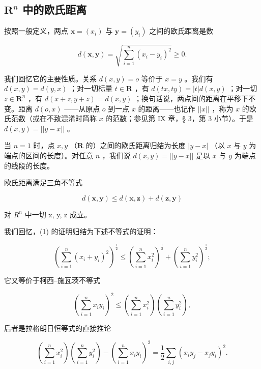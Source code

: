 \subsection{\texorpdfstring{\(\mathbf{R}^n\) 中的欧氏距离}{R 的 n 次幂中的欧氏距离}}

按照一般定义，两点 \(\boldsymbol{x} = (x_{i})\) 与 \(\boldsymbol{y} = (y_{i})\) 之间的欧氏距离是数

\[
d (\boldsymbol {x}, \boldsymbol {y}) = \sqrt {\sum_ {i = 1} ^ {n} (x _ {i} - y _ {i}) ^ {2}} \geqslant 0.
\]

我们回忆它的主要性质。关系 \(d(x, y) = o\) 等价于 \(x = y\) 。我们有 \(d(x, y) = d(y, x)\) ；对一切标量 \(t \in \mathbf{R}\) ，有 \(d(tx, ty) = |t|d(x, y)\) ；对一切 \(z \in \mathbf{R}^n\) ，有 \(d(x + z, y + z) = d(x, y)\) ；换句话说，两点间的距离在平移下不变。距离 \(d(o, x)\) ——从原点 \(o\) 到一点 \(x\) 的距离——也记作 \(||x||\) ，称为 \(x\) 的欧氏范数（或在不致混淆时简称 \(x\) 的范数；参见第 IX 章，§ 3，第 3 小节）。于是 \(d(x, y) = ||y - x||\) 。

当 \(n = 1\) 时，点 \(x, y\) （\(\mathbf{R}\) 的）之间的欧氏距离归结为长度 \(|y - x|\) （以 \(x\) 与 \(y\) 为端点的区间的长度）。对任意 \(n\) ，我们说 \(d(x, y) = ||y - x||\) 是以 \(x\) 与 \(y\) 为端点的线段的长度。

欧氏距离满足三角不等式

\[
d (\boldsymbol {x}, \boldsymbol {y}) \leqslant d (\boldsymbol {x}, \boldsymbol {z}) + d (\boldsymbol {z}, \boldsymbol {y})\tag{1}
\]

对 \(R^{n}\) 中一切 x, y, z 成立。

我们回忆，(1) 的证明归结为下述不等式的证明：

\[
\left(\sum_ {i = 1} ^ {n} \left(x _ {i} + y _ {i}\right) ^ {2}\right) ^ {\frac {1}{2}} \leqslant \left(\sum_ {i = 1} ^ {n} x _ {i} ^ {2}\right) ^ {\frac {1}{2}} + \left(\sum_ {i = 1} ^ {n} y _ {i} ^ {2}\right) ^ {\frac {1}{2}};
\]

它又等价于柯西–施瓦茨不等式

\[
\left(\sum_ {i = 1} ^ {n} x _ {i} y _ {i}\right) ^ {2} \leqslant \left(\sum_ {i = 1} ^ {n} x _ {i} ^ {2}\right) \left(\sum_ {i = 1} ^ {n} y _ {i} ^ {2}\right),
\]

后者是拉格朗日恒等式的直接推论

\[
\left(\sum_ {i = 1} ^ {n} x _ {i} ^ {2}\right) \left(\sum_ {i = 1} ^ {n} y _ {i} ^ {2}\right) - \left(\sum_ {i = 1} ^ {n} x _ {i} y _ {i}\right) ^ {2} = \frac {1}{2} \sum_ {i, j} (x _ {i} y _ {j} - x _ {j} y _ {i}) ^ {2}.
\]

